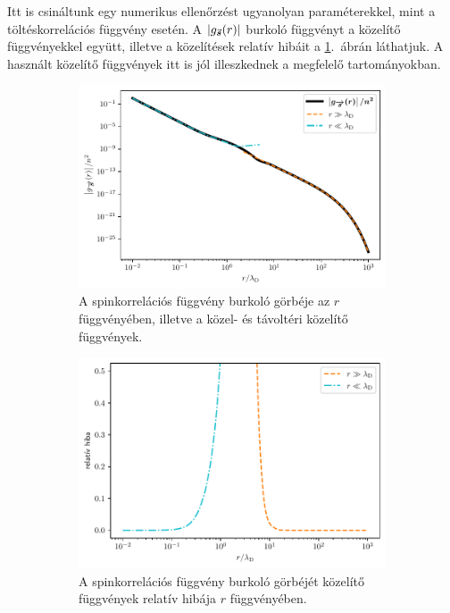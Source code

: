 \documentclass[a4paper,12pt,titlepage]{article}
\begin{document}
Itt is csináltunk egy numerikus ellenőrzést ugyanolyan paraméterekkel, mint a töltéskorrelációs függvény esetén.  A $\left| g_{\va*{s}}(r) \right|$ burkoló függvényt a közelítő függvényekkel együtt, illetve a közelítések relatív hibáit a \ref{s-fig}.\ ábrán láthatjuk.  A használt közelítő függvények itt is jól illeszkednek a megfelelő tartományokban.

\begin{figure}[h!]
	\centering
	\begin{subfigure}[t]{0.48\linewidth}
		\centering
		\includegraphics[width=\linewidth]{s.pdf}
		\caption{\centering A spinkorrelációs függvény burkoló görbéje az $r$ függvényében, illetve a közel- \newline és távoltéri közelítő függvények.}
	\end{subfigure}%
	\begin{subfigure}[t]{0.48\linewidth}
		\centering
		\includegraphics[width=0.96\linewidth]{s_error.pdf}
		\caption{\centering A spinkorrelációs függvény burkoló görbéjét közelítő függvények relatív hibája \newline $r$ függvényében.}
	\end{subfigure}
	\caption{}
	\label{s-fig}
\end{figure}
\end{document}
